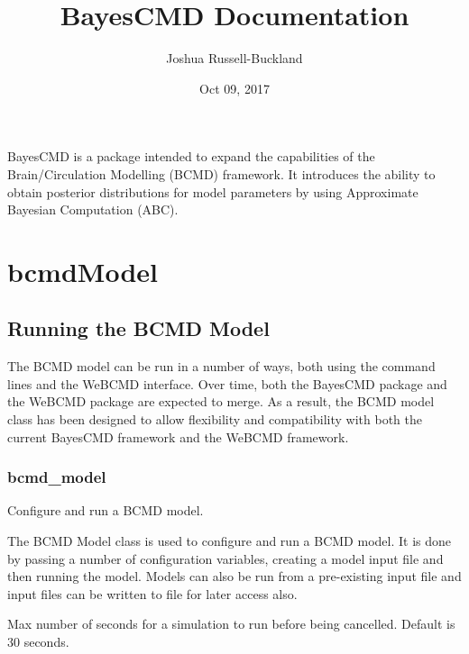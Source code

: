 \documentclass[letterpaper,10pt,english]{sphinxmanual}
\title{BayesCMD Documentation}
\date{Oct 09, 2017}
\author{Joshua Russell-Buckland}
\begin{document}
\maketitle
\sphinxtableofcontents
{}\label{\detokenize{index::doc}}


BayesCMD is a package intended to expand the capabilities of the
Brain/Circulation Modelling (BCMD) framework. It introduces the ability to
obtain posterior distributions for model parameters by using Approximate
Bayesian Computation (ABC).


\chapter{bcmdModel}
\label{\detokenize{bcmdModel::doc}}\label{\detokenize{bcmdModel:welcome-to-bayescmd-s-documentation}}\label{\detokenize{bcmdModel:bcmdmodel}}

\section{Running the BCMD Model}
\label{\detokenize{bcmdModel:running-the-bcmd-model}}
The BCMD model can be run in a number of ways, both using the command lines
and the WeBCMD interface. Over time, both the BayesCMD package and the WeBCMD
package are expected to merge. As a result, the BCMD model class has been
designed to allow flexibility and compatibility with both the current BayesCMD
framework and the WeBCMD framework.


\subsection{bcmd\_model}
\label{\detokenize{bcmdModel:module-bayescmd.bcmdModel.bcmd_model}}\label{\detokenize{bcmdModel:bcmd-model}}
Configure and run a BCMD model.

The BCMD Model class is used to configure and run a BCMD model. It is done by
passing a number of configuration variables, creating a model input file and
then running the model. Models can also be run from a pre-existing input file
and input files can be written to file for later access also.

\begin{fulllineitems}
\label{\detokenize{bcmdModel:bayescmd.bcmdModel.bcmd_model.TIMEOUT}}
 \textendash{} Max number of seconds for a simulation to run before being cancelled.
Default is 30 seconds.

\end{fulllineitems}
\end{document}
